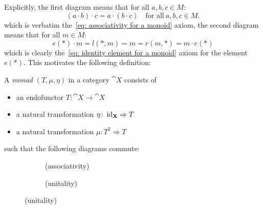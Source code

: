 Explicitly, the first diagram means that for all $a,b,c \in M$:
\[
    (a \cdot b) \cdot c = a \cdot (b \cdot c) 
    \quad \text{for all} \ a,b,c \in M.
\]
which is verbatim the~\ref{eq: associativity for a monoid} axiom, the second diagram means that for all $m \in M$:
\[
  e(\ast) \cdot m = l(\ast,m) = m = r(m,\ast) = m \cdot e(\ast)  
\]
which is clearly the~\ref{eq: identity element for a monoid} axiom 
for the element $e(\ast)$.
This motivates the following definition: 
\begin{definition}[monad]
A \textit{monad} $(T,\mu, \eta) $ in a category $\cat{X}$ consists of
\begin{itemize}
    \item an endofunctor $T\colon \cat{X} \to \cat{X}$
    \item a natural transformation $\eta \colon \operatorname{id}_{\mathbf{X}} \Rightarrow T$ 
    \item a natural transformation $\mu\colon T^2 \Rightarrow T $
\end{itemize}  
such that the following diagrams commute: \\
\begin{figure}[H]
    \centering
    \begin{subfigure}{0.3\textwidth}
        \centering
        \label{dia: associativity}
        \caption*{(associativity)}
    \end{subfigure}
    \hspace{2em}
    \begin{subfigure}{0.3\textwidth}
        \centering
        \label{dia: unitality}
        \caption*{(unitality)}
    \end{subfigure} 
\end{figure}


\end{definition}
